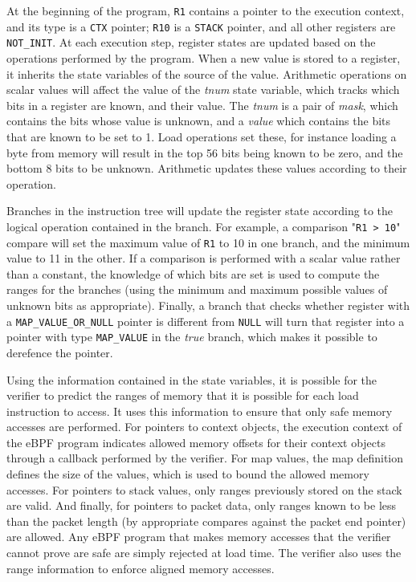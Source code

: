 \documentclass[10pt]{sig-alternate-05-2015}
\begin{document}
At the beginning of the program, \texttt{R1} contains a pointer to the execution
context, and its type is a \texttt{CTX} pointer; \texttt{R10} is a \texttt{STACK}
pointer, and all other registers are \texttt{NOT\_INIT}. At each execution step,
register states are updated based on the operations performed by the program.
When a new value is stored to a register, it inherits the state variables of the
source of the value. Arithmetic operations on scalar values will affect the
value of the \emph{tnum} state variable, which tracks which bits in a register
are known, and their value. The \emph{tnum} is a pair of \emph{mask}, which
contains the bits whose value is unknown, and a \emph{value} which contains the
bits that are known to be set to 1. Load operations set these, for instance
loading a byte from memory will result in the top 56 bits being known to be
zero, and the bottom 8 bits to be unknown. Arithmetic updates these values
according to their operation.

Branches in the instruction tree will update the register state according to the
logical operation contained in the branch. For example, a comparison "\texttt{R1
  > 10}" compare will set the maximum value of \texttt{R1} to 10 in one branch,
and the minimum value to 11 in the other. If a comparison is performed with a
scalar value rather than a constant, the knowledge of which bits are set is used
to compute the ranges for the branches (using the minimum and maximum possible
values of unknown bits as appropriate). Finally, a branch that checks whether
register with a \texttt{MAP\_VALUE\_OR\_NULL} pointer is different from
\texttt{NULL} will turn that register into a pointer with type
\texttt{MAP\_VALUE} in the \emph{true} branch, which makes it possible to
derefence the pointer.

Using the information contained in the state variables, it is possible for the
verifier to predict the ranges of memory that it is possible for each load
instruction to access. It uses this information to ensure that only safe memory
accesses are performed. For pointers to context objects, the execution context
of the eBPF program indicates allowed memory offsets for their context objects
through a callback performed by the verifier. For map values, the map definition
defines the size of the values, which is used to bound the allowed memory
accesses. For pointers to stack values, only ranges previously stored on the
stack are valid. And finally, for pointers to packet data, only ranges known to
be less than the packet length (by appropriate compares against the packet end
pointer) are allowed. Any eBPF program that makes memory accesses that the
verifier cannot prove are safe are simply rejected at load time. The verifier
also uses the range information to enforce aligned memory accesses.
\end{document}
